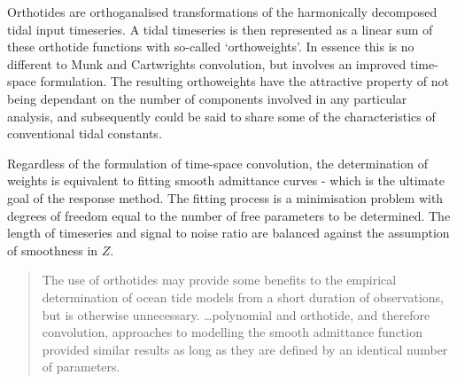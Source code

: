 Orthotides are orthoganalised transformations of the harmonically decomposed tidal input timeseries.
A tidal timeseries is then represented as a linear sum of these orthotide functions with so-called `orthoweights'. In essence this is no different to Munk and Cartwrights convolution, but involves an improved time-space formulation.  
The resulting orthoweights have the attractive property of not being dependant on the number of components involved in any particular analysis, and subsequently could be said to share some of the characteristics of conventional tidal constants.

Regardless of the formulation of time-space convolution, the determination of weights is equivalent to fitting smooth admittance curves - which is the ultimate goal of the response method.  The fitting process is a minimisation problem with degrees of freedom equal to the number of free parameters to be determined.    The length of timeseries and signal to noise ratio are balanced against the assumption of smoothness in $Z$.
\begin{quotation}   
The use of orthotides may provide some benefits to the empirical determination of ocean tide models from a short duration of observations, but is otherwise unnecessary. \dots  polynomial and orthotide, and therefore convolution, approaches to modelling the smooth admittance function provided similar results as long as they are defined by an identical number of parameters.\citep{Desai:2006wo}
\end{quotation}
